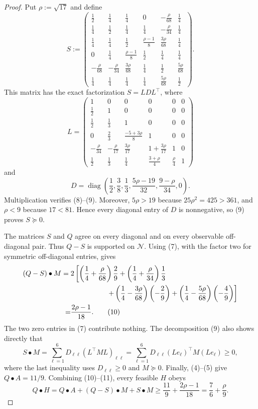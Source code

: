 \documentclass{article}
\begin{document}
\begin{proof}
Put \(\rho:=\sqrt{17}\) and define
\[
S:=
\begin{pmatrix}
\frac12&\frac14&\frac14&0&-\frac\rho{68}&\frac14\\
\frac14&\frac12&\frac14&\frac14&-\frac\rho{34}&\frac14\\
\frac14&\frac14&\frac12&\frac{\rho-1}{8}&\frac{3\rho}{68}&\frac14\\
0&\frac14&\frac{\rho-1}{8}&\frac12&\frac14&\frac14\\
-\frac\rho{68}&-\frac\rho{34}&\frac{3\rho}{68}&\frac14&\frac12&\frac{5\rho}{68}\\
\frac14&\frac14&\frac14&\frac14&\frac{5\rho}{68}&\frac12
\end{pmatrix}. \tag{8}
\]
This matrix has the exact factorization \(S=LDL^\top\), where
\[
L=
\begin{pmatrix}
1&0&0&0&0&0\\
\frac12&1&0&0&0&0\\
\frac12&\frac13&1&0&0&0\\
0&\frac23&\frac{-5+3\rho}{8}&1&0&0\\
-\frac\rho{34}&-\frac\rho{17}&\frac{3\rho}{17}&1+\frac{3\rho}{17}&1&0\\
\frac12&\frac13&\frac14&\frac{3+\rho}{4}&\frac\rho4&1
\end{pmatrix}
\]
and
\[
D=\operatorname{diag}\left(
\frac12,\frac38,\frac13,\frac{5\rho-19}{32},
\frac{9-\rho}{34},0\right). \tag{9}
\]
Multiplication verifies (8)--(9).  Moreover, \(5\rho>19\) because \(25\rho^2=425>361\), and \(\rho<9\) because \(17<81\).  Hence every diagonal entry of \(D\) is nonnegative, so (9) proves \(S\succeq0\).

The matrices \(S\) and \(Q\) agree on every diagonal and on every observable off-diagonal pair.  Thus \(Q-S\) is supported on \(\mathcal N\).  Using (7), with the factor two for symmetric off-diagonal entries, gives
\[
\begin{aligned}
(Q-S)\mathbin\bullet M
={}&2\left[
\left(\frac14+\frac\rho{68}\right)\frac29
+\left(\frac14+\frac\rho{34}\right)\frac13
\right.\\
&\left.\hspace{18mm}
+\left(\frac14-\frac{3\rho}{68}\right)\left(-\frac29\right)
+\left(\frac14-\frac{5\rho}{68}\right)\left(-\frac49\right)
\right]\\
=&\frac{2\rho-1}{18}. \tag{10}
\end{aligned}
\]
The two zero entries in (7) contribute nothing.  The decomposition (9) also shows directly that
\[
S\mathbin\bullet M
=\sum_{\ell=1}^6 D_{\ell\ell}(L^\top M L)_{\ell\ell}
=\sum_{\ell=1}^6D_{\ell\ell}(Le_\ell)^\top M(Le_\ell)\ge0, \tag{11}
\]
where the last inequality uses \(D_{\ell\ell}\ge0\) and \(M\succeq0\).  Finally, (4)--(5) give \(Q\mathbin\bullet A=11/9\).  Combining (10)--(11), every feasible \(H\) obeys
\[
Q\mathbin\bullet H
=Q\mathbin\bullet A+(Q-S)\mathbin\bullet M+S\mathbin\bullet M
\ge \frac{11}{9}+\frac{2\rho-1}{18}
=\frac76+\frac\rho9. \tag{12}
\]


\end{proof}
\end{document}
